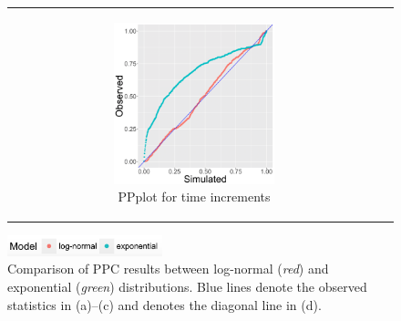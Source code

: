 \documentclass[ba]{imsart}
\numberwithin{equation}{section}
\theoremstyle{plain}
\begin{document}
\begin{figure}[H]
\begin{tabular}[t]{cc}
\begin{subfigure}[b]{0.495\textwidth}
				\end{subfigure}
				\begin{subfigure}[b]{0.495\textwidth}
					\centering
					\caption{PPplot for time increments}
					\includegraphics[width=0.56\textwidth]{img/timePPplot2-1.png}
				\end{subfigure}
			\end{tabular}
						\includegraphics[width=0.4\textwidth]{img/modellabel.png}
			\caption {Comparison of PPC results between log-normal (\textit{red}) and exponential (\textit{green}) distributions. Blue lines denote the observed statistics in (a)--(c) and denotes the diagonal line in (d).}
			\label{figure:PPCtwo}
		\end{figure}
		\newpage
\end{document}
